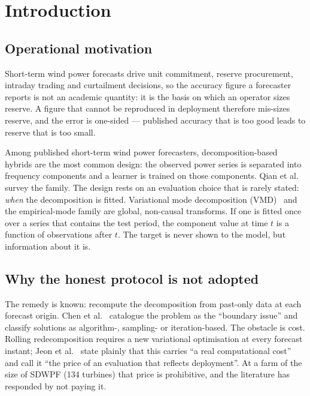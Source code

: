 \documentclass[review,3p,times]{elsarticle}
\begin{document}
\section{Introduction}\label{sec:intro}

\subsection{Operational motivation}

Short-term wind power forecasts drive unit commitment, reserve procurement,
intraday trading and curtailment decisions, so the accuracy figure a
forecaster reports is not an academic quantity: it is the basis on which an
operator sizes reserve. A figure that cannot be reproduced in deployment
therefore mis-sizes reserve, and the error is one-sided --- published accuracy
that is too good leads to reserve that is too small.

Among published short-term wind power forecasters, decomposition-based
hybrids are the most common design: the observed power series is separated
into frequency components and a learner is trained on those components.
Qian et al.~\cite{qian2019} survey the family. The design rests on an
evaluation choice that is rarely stated: \emph{when} the decomposition is
fitted. Variational mode decomposition (VMD)~\cite{dragomiretskiy2014} and the
empirical-mode family are global, non-causal transforms. If one is fitted once
over a series that contains the test period, the component value at time $t$
is a function of observations after $t$. The target is never shown to the
model, but information about it is.

\subsection{Why the honest protocol is not adopted}

The remedy is known: recompute the decomposition from past-only data at each
forecast origin. Chen et al.~\cite{chen2022} catalogue the problem as the
``boundary issue'' and classify solutions as algorithm-, sampling- or
iteration-based. The obstacle is cost. Rolling redecomposition requires a new
variational optimisation at every forecast instant; Jeon et al.~\cite{jeon2026}
state plainly that this carries ``a real computational cost'' and call it ``the
price of an evaluation that reflects deployment''. At a farm of the size of
SDWPF (134 turbines) that price is prohibitive, and the literature has
responded by not paying it.
\end{document}
